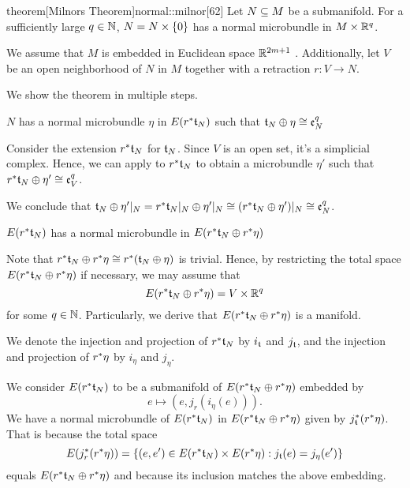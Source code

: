 \begin{scope} \newcommand{\rwhitney} { \whitney{\ind{r}\bt_N}{\ind{r}\eta} } \newcommand{\rtn} { \ind{r}\bt_N }

\begin{mystatement}{theorem}[Milnors Theorem]{normal::milnor}[62] Let $N \sub M$ be a submanifold. For a sufficiently large $q \in \N$, $N = \cyldown{N}$ has a normal microbundle in $M \cross \R^q$. \end{mystatement}

\begin{myproof} We assume that $M$ is embedded in Euclidean space $\R^{2m + 1}$ \cite[p.60]{dimension}. Additionally, let $V$ be an open neighborhood of $N$ in $M$ together with a retraction $r: V \to N$.

We show the theorem in multiple steps. \begin{steps} \item $N$ has a normal microbundle $\eta$ in $E(\ind{r}\bt_N)$ such that $\whitney{\bt_N}{\eta} \cong \be[q]{N}$

Consider the extension $\ind{r}\bt_N$ for $\bt_N$. Since $V$ is an open set, it's a simplicial complex. Hence, we can apply  to $\ind{r}\bt_N$ to obtain a microbundle $\eta'$ such that $\whitney{\ind{r}\bt_N}{\eta'} \cong \be[q]{V}$.

We conclude that $\whitney{\bt_N}{\eta'\restr{N}} = \whitney{\ind{r}\bt_N\restr{N}}{\eta'\restr{N}} \cong (\whitney{\ind{r}\bt_N}{\eta'})\restr{N} \cong \be[q]{N}$.

\item $E(\rtn)$ has a normal microbundle in $E(\rwhitney)$

Note that $\rwhitney \cong \ind{r}(\whitney{\bt_N}{\eta})$ is trivial. Hence, by restricting the total space $E(\rwhitney)$ if necessary, we may assume that \[ E(\rwhitney) = V \cross \R^q \] for some $q \in \N$. Particularly, we derive that $E(\rwhitney)$ is a manifold.

We denote the injection and projection of $\rtn$ by $i_{\bt}$ and $j_{\bt}$, and the injection and projection of $\ind{r}\eta$ by $i_{\eta}$ and $j_{\eta}$.

We consider $E(\rtn)$ to be a submanifold of $E(\rwhitney)$ embedded by \[ e \mapsto (e, j_{r}(i_{\eta}(e))). \] We have a normal microbundle of $E(\rtn)$ in $E(\rwhitney)$ given by $\ind{j_{\bt}}(\ind{r}\eta)$. That is because the total space \[ E(\ind{j_r}(\ind{r}\eta)) = \set{(e, e') \in E(\rtn) \cross E(\ind{r}\eta)}{j_{\bt}(e) = j_\eta(e')} \] equals $E(\rwhitney)$ and because its inclusion matches the above embedding.


\end{steps}
\end{myproof}
\end{scope}
